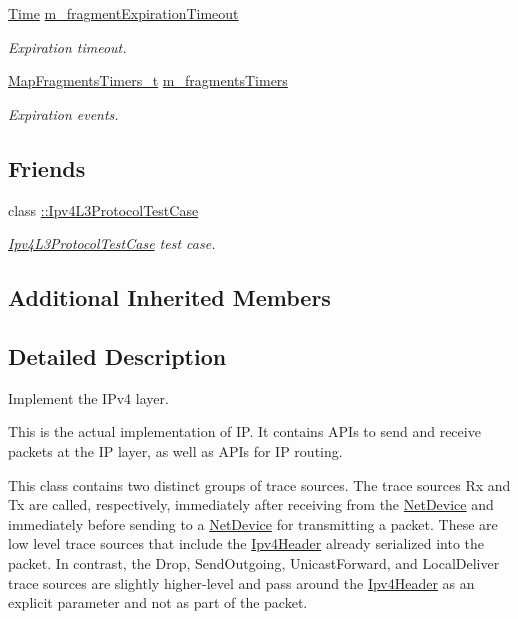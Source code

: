 \begin{DoxyCompactItemize}
\hyperlink{classns3_1_1Time}{Time} \hyperlink{classns3_1_1Ipv4L3Protocol_a6ad1c5e5d4bde4a903aadab94c6ec164}{m\+\_\+fragment\+Expiration\+Timeout}
\begin{DoxyCompactList}\small\item\em Expiration timeout. \end{DoxyCompactList}\item 
\hyperlink{classns3_1_1Ipv4L3Protocol_acce90cf84f9acda8706768a1c266bfc8}{Map\+Fragments\+Timers\+\_\+t} \hyperlink{classns3_1_1Ipv4L3Protocol_a3233e1de6e8f43299a353107adafbed2}{m\+\_\+fragments\+Timers}
\begin{DoxyCompactList}\small\item\em Expiration events. \end{DoxyCompactList}\end{DoxyCompactItemize}
\subsection*{Friends}
\begin{DoxyCompactItemize}
\item 
class \hyperlink{classns3_1_1Ipv4L3Protocol_a1c97ab904d8fa88c56c79a0d235325e9}{\+::\+Ipv4\+L3\+Protocol\+Test\+Case}
\begin{DoxyCompactList}\small\item\em \hyperlink{classIpv4L3ProtocolTestCase}{Ipv4\+L3\+Protocol\+Test\+Case} test case. \end{DoxyCompactList}\end{DoxyCompactItemize}
\subsection*{Additional Inherited Members}


\subsection{Detailed Description}
Implement the I\+Pv4 layer. 

This is the actual implementation of IP. It contains A\+P\+Is to send and receive packets at the IP layer, as well as A\+P\+Is for IP routing.

This class contains two distinct groups of trace sources. The trace sources \textquotesingle{}Rx\textquotesingle{} and \textquotesingle{}Tx\textquotesingle{} are called, respectively, immediately after receiving from the \hyperlink{classns3_1_1NetDevice}{Net\+Device} and immediately before sending to a \hyperlink{classns3_1_1NetDevice}{Net\+Device} for transmitting a packet. These are low level trace sources that include the \hyperlink{classns3_1_1Ipv4Header}{Ipv4\+Header} already serialized into the packet. In contrast, the Drop, Send\+Outgoing, Unicast\+Forward, and Local\+Deliver trace sources are slightly higher-\/level and pass around the \hyperlink{classns3_1_1Ipv4Header}{Ipv4\+Header} as an explicit parameter and not as part of the packet.


